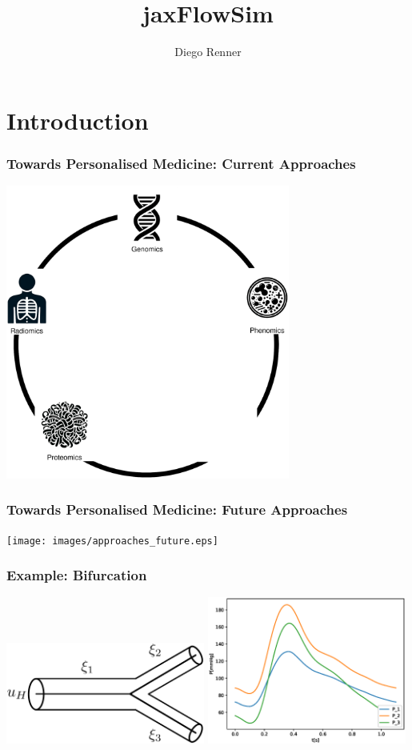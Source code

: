 \documentclass{beamer}
\title{jaxFlowSim}
\author{Diego Renner}
\begin{document}
\section{Introduction}
\maketitle

\begin{frame}
	\frametitle{Towards Personalised Medicine: Current Approaches}
	\begin{center}
		\includegraphics[width=0.70\textwidth]{images/approaches_current.eps}
	\end{center}
\end{frame}

\begin{frame}
	\frametitle{Towards Personalised Medicine: Future Approaches}
	\begin{center}
		\texttt{[image: images/approaches\_future.eps]}
	\end{center}
\end{frame}
\begin{frame}
	\frametitle{Example: Bifurcation}
	\begin{center}
			\includegraphics[width=0.49\textwidth]{images/bifurcation.eps}
			\includegraphics[width=0.49\textwidth]{images/compare_output_params_P_P.eps}
	\end{center}
\end{frame}
\end{document}
